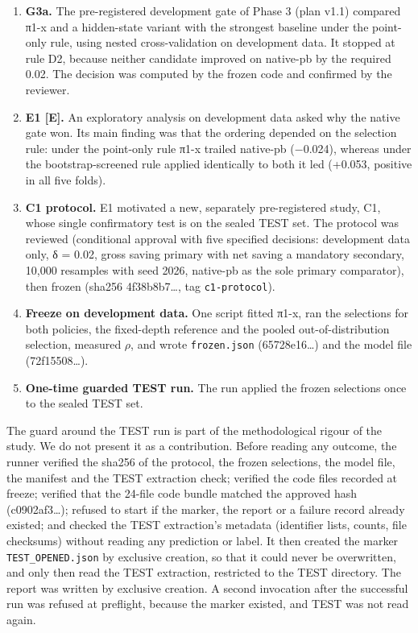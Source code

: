 \begin{enumerate}
\def\labelenumi{\arabic{enumi}.}
\tightlist
\item
  \textbf{G3a.} The pre-registered development gate of Phase 3 (plan v1.1) compared π1-x and a hidden-state variant with the strongest baseline under the point-only rule, using nested cross-validation on development data. It stopped at rule D2, because neither candidate improved on native-pb by the required 0.02. The decision was computed by the frozen code and confirmed by the reviewer.
\item
  \textbf{E1 {[}E{]}.} An exploratory analysis on development data asked why the native gate won. Its main finding was that the ordering depended on the selection rule: under the point-only rule π1-x trailed native-pb (−0.024), whereas under the bootstrap-screened rule applied identically to both it led (+0.053, positive in all five folds).
\item
  \textbf{C1 protocol.} E1 motivated a new, separately pre-registered study, C1, whose single confirmatory test is on the sealed TEST set. The protocol was reviewed (conditional approval with five specified decisions: development data only, δ = 0.02, gross saving primary with net saving a mandatory secondary, 10,000 resamples with seed 2026, native-pb as the sole primary comparator), then frozen (sha256 4f38b8b7\ldots, tag \texttt{c1-protocol}).
\item
  \textbf{Freeze on development data.} One script fitted π1-x, ran the selections for both policies, the fixed-depth reference and the pooled out-of-distribution selection, measured \(\rho\), and wrote \texttt{frozen.json} (65728e16\ldots) and the model file (72f15508\ldots).
\item
  \textbf{One-time guarded TEST run.} The run applied the frozen selections once to the sealed TEST set.
\end{enumerate}

The guard around the TEST run is part of the methodological rigour of the study. We do not present it as a contribution. Before reading any outcome, the runner verified the sha256 of the protocol, the frozen selections, the model file, the manifest and the TEST extraction check; verified the code files recorded at freeze; verified that the 24-file code bundle matched the approved hash (c0902af3\ldots); refused to start if the marker, the report or a failure record already existed; and checked the TEST extraction's metadata (identifier lists, counts, file checksums) without reading any prediction or label. It then created the marker \texttt{TEST\_OPENED.json} by exclusive creation, so that it could never be overwritten, and only then read the TEST extraction, restricted to the TEST directory. The report was written by exclusive creation. A second invocation after the successful run was refused at preflight, because the marker existed, and TEST was not read again.

